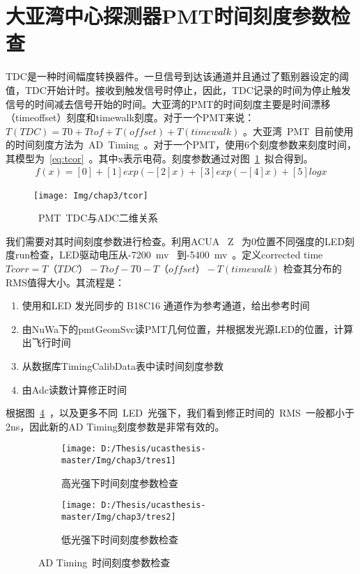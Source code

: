 \section{大亚湾中心探测器PMT时间刻度参数检查}
TDC是一种时间幅度转换器件。一旦信号到达该通道并且通过了甄别器设定的阈值，TDC开始计时。接收到触发信号时停止，因此，TDC记录的时间为停止触发信号的时间减去信号开始的时间。大亚湾的PMT的时间刻度主要是时间漂移（timeoffset）刻度和timewalk刻度。对于一个PMT来说：$ T(TDC)=T0+Ttof+T(offset)+T(timewalk) $ 。大亚湾~PMT~目前使用的时间刻度方法为~AD~Timing~。对于一个PMT，使用6个刻度参数来刻度时间，其模型为~\ref{eq:tcor}~。其中x表示电荷。刻度参数通过对图~\ref{fig:tcor}~拟合得到。
\begin{eqnarray}\label{eq:tcor}
f(x) = [0]+[1]exp(-[2]x)+[3]exp(-[4]x)+[5]logx
\end{eqnarray}

\begin{figure}[!htbp]
  \centering
   \texttt{[image: Img/chap3/tcor]}
    \caption{~PMT~TDC与ADC二维关系}
  \label{fig:tcor}
\end{figure}
我们需要对其时间刻度参数进行检查。利用ACUA ~Z~ 为0位置不同强度的LED刻度run检查，LED驱动电压从-7200~mv~ 到-5400~mv~。定义corrected time $Tcorr=T （TDC）-Ttof-T0-T（offset）-T(timewalk) $ 检查其分布的RMS值得大小。其流程是：
 \begin{enumerate}
\item 使用和LED 发光同步的 B18C16 通道作为参考通道，给出参考时间 
\item 由NuWa下的pmtGeomSvc读PMT几何位置，并根据发光源LED的位置，计算出飞行时间
\item 从数据库TimingCalibData表中读时间刻度参数
\item 由Adc读数计算修正时间
\end{enumerate}
根据图~\ref{fig:tres}~，以及更多不同~LED~光强下，我们看到修正时间的~RMS~一般都小于2ns，因此新的AD Timing刻度参数是非常有效的。

\begin{figure}[!htbp]
  \centering
  \begin{subfigure}[b]{\MySubFactor\textwidth}
    \texttt{[image: D:/Thesis/ucasthesis-master/Img/chap3/tres1]}
    \caption{高光强下时间刻度参数检查}
    \label{fig:tres_1}
  \end{subfigure}%
  \quad\quad\quad\quad%
  \begin{subfigure}[b]{\MySubFactor\textwidth}
    \texttt{[image: D:/Thesis/ucasthesis-master/Img/chap3/tres2]}
    \caption{ 低光强下时间刻度参数检查}
    \label{fig:tres_2}
  \end{subfigure}
  \caption{~AD Timing~时间刻度参数检查}
  \label{fig:tres}
\end{figure}



